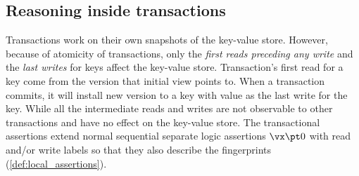 \subsection{Reasoning inside transactions}

Transactions work on their own snapshots of the key-value store.
However, because of atomicity of transactions, only the \emph{first reads preceding any write} and the \emph{last writes} for keys affect the key-value store.
Transaction's first read for a key come from the version that initial view points to.
When a transaction commits, it will install new version to a key with value as the last write for the key.
While all the intermediate reads and writes are not observable to other transactions and have no effect on the key-value store.
The transactional assertions extend normal sequential separate logic assertions \eg \( \vx \pt 0 \) with read and/or write labels so that they also describe the fingerprints (\cref{def:local_assertions}).


